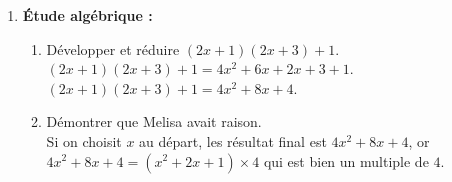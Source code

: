 \begin{corrige}
\begin{enumerate}
\begin{enumerate}
            {\bfseries Formule 2 : } \\
            {\bfseries Formule 3 : } \\
            {\bfseries Formule 4 : } \\
            {\red Les formules 1 et 3 peuvent être saisies en D3.\\
            {\bfseries Formule 1 : } \\
            {\bfseries Formule 3 : } \\            
            }            
        \end{enumerate}
        \setcounter{enumi}{2}
        \item {\bfseries Étude algébrique : }\\        
        \begin{enumerate}
            \item Développer et réduire $(2x+1)(2x+3)+1$.\\
            {\red $(2x+1)(2x+3)+1 = 4x^2+6x+2x+3+1$.\\
            $(2x+1)(2x+3)+1 = 4x^2+8x+4$.\\
            }
            \item Démontrer que Melisa avait raison.\\
            {\red Si on choisit $x$ au départ, les résultat final est $4x^2+8x+4$, or $4x^2+8x+4=(x^2+2x+1)\times 4$ qui est bien un multiple de $4$.}
            
        \end{enumerate}
    \end{enumerate}
\end{corrige}

